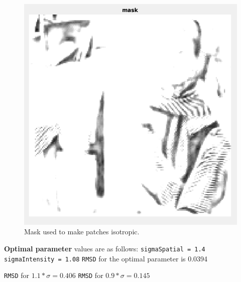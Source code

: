\documentclass{article}
\begin{document}
\begin{figure}[h!]
  \includegraphics[width=\linewidth]{mask.png}
  \caption{Mask used to make patches isotropic.}
  \label{fig:result2}
\end{figure}

\newpage
\textbf{Optimal parameter} values are as follows: \newline
\texttt{sigmaSpatial = 1.4} \newline
\texttt{sigmaIntensity = 1.08} \newline  
\texttt{RMSD} for the optimal parameter is 0.0394

\vskip 0.2in

\texttt{RMSD} for \(1.1*\sigma = 0.406\) \newline
\texttt{RMSD} for \(0.9*\sigma = 0.145\) 

\end{document}
